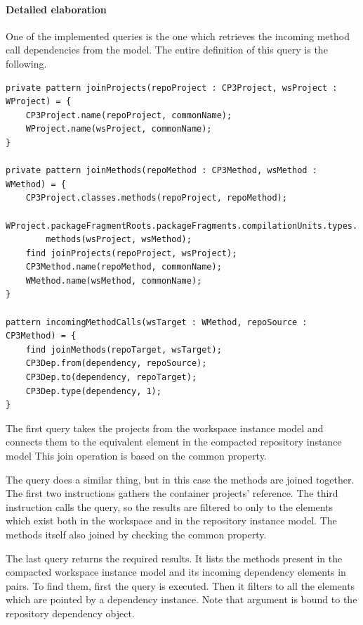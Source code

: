 \paragraph{Detailed elaboration}
One of the implemented queries is the one which retrieves the incoming method call 
dependencies from the model. The entire definition of this query is the following. 
\begin{lstlisting}[caption=Elements of the incoming method call dependency query,label=patternex]
private pattern joinProjects(repoProject : CP3Project, wsProject : WProject) = {
	CP3Project.name(repoProject, commonName);
	WProject.name(wsProject, commonName);
}

private pattern joinMethods(repoMethod : CP3Method, wsMethod : WMethod) = {
	CP3Project.classes.methods(repoProject, repoMethod);
	WProject.packageFragmentRoots.packageFragments.compilationUnits.types.
		methods(wsProject, wsMethod);
	find joinProjects(repoProject, wsProject);
	CP3Method.name(repoMethod, commonName);
	WMethod.name(wsMethod, commonName);
}

pattern incomingMethodCalls(wsTarget : WMethod, repoSource : CP3Method) = {
	find joinMethods(repoTarget, wsTarget);
	CP3Dep.from(dependency, repoSource);
	CP3Dep.to(dependency, repoTarget);
	CP3Dep.type(dependency, 1);
}
\end{lstlisting}

The first  query takes the projects from the workspace
instance model and connects them to the equivalent element in the compacted
repository instance model This join operation is based on the common 
property.

The  query does a similar thing, but in this case the methods
are joined together. The first two instructions gathers the container projects'
reference. The third instruction calls the  query, so the 
results are filtered to only to the elements which exist both in the workspace
and in the repository instance model. The methods itself also joined by 
checking the common  property.

The last  query returns the required results. It lists
the methods present in the compacted workspace instance model and its incoming
dependency elements in pairs. To find them, first the  query
is executed. Then it filters to all the elements which are pointed by a
dependency instance. Note that  argument is bound to the
repository dependency object.

